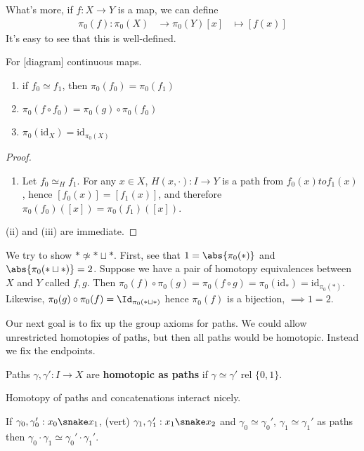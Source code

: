\documentclass{article}
\newcommand{\id}{\mathrm{id}}
\numberwithin{nthm}{subsection}
\begin{document}
What's more, if $f: X \to Y$ is a map, we can define
\begin{align*}
    \pi_0(f): \pi_0(X) &\to \pi_0(Y)
    [x] &\mapsto [f(x)]
\end{align*}
It's easy to see that this is well-defined.

\begin{nprop}
    For [diagram] continuous maps.
    \begin{enumerate}[label=(\roman*)]
        \item if $f_0 \simeq f_1$, then $\pi_0(f_0) = \pi_0(f_1)$
        \item $\pi_0(f \circ f_0) = \pi_0(g) \circ \pi_0(f_0)$
        \item $\pi_0(\id_X) = \id_{\pi_0(X)}$
    \end{enumerate}
\end{nprop}

\begin{proof}
    \leavevmode
    \begin{enumerate}[label=(\roman*)]
        \item Let $f_0 \simeq_H f_1$. For any $x \in X$, $H(x, \cdot): I \to Y$ is a path from $f_0(x) to f_1(x)$, hence $[f_0(x)] = [f_1(x)]$, and therefore $\pi_0(f_0)([x]) = \pi_0(f_1)([x])$.
    \end{enumerate}
    (ii) and (iii) are immediate.
\end{proof}

\begin{eg}
    We try to show $* \not \simeq * \sqcup *$.  First, see that $1 = \abs{\pi_0(*)}$ and $\abs{\pi_0(* \sqcup *)} = 2$. Suppose we have a pair of homotopy equivalences between $X$ and $Y$ called $f, g$.  Then $\pi_0(f) \circ \pi_0(g) = \pi_0(f \circ g) = \pi_0(\id_*) = \id_{\pi_0(*)}$. Likewise, $\pi_0(g) \circ \pi_0(f) = \Id_{\pi_0(* \sqcup *)}$ hence $\pi_0(f)$ is a bijection, $\implies 1=2$.
\end{eg}

Our next goal is to fix up the group axioms for paths. We could allow unrestricted homotopies of paths, but then all paths would be homotopic. Instead we fix the endpoints.

Paths $\gamma, \gamma': I \to X$ are \textbf{homotopic as paths} if $\gamma \simeq \gamma'$ rel $\{0, 1\}$.

Homotopy of paths and concatenations interact nicely.

\begin{nlemma}
    If $\gamma_0, \gamma_0': x_0 \snake x_1$, (vert) $\gamma_1, \gamma_1': x_1 \snake x_2$ and $\gamma_0 \simeq \gamma_0'$, $\gamma_1 \simeq \gamma_1'$ as paths then $\gamma_0 \cdot \gamma_1 \simeq \gamma_0' \cdot \gamma_1'$.
\end{nlemma}
\end{document}
